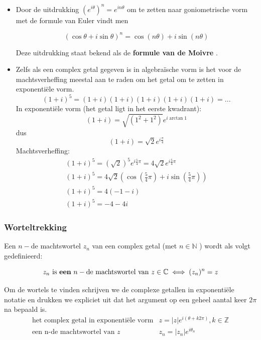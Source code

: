 \begin{itemize}
	\item Door de uitdrukking $(e^{i \theta})^n = e^{i n \theta}$ om te zetten naar goniometrische vorm met de formule van Euler vindt men
	\begin{framed}
		\[  (\cos \theta + i \sin \theta)^n = \cos (n\theta)+i \sin(n \theta) \]
	\end{framed}
	Deze uitdrukking staat bekend als de {\bf formule van de Moivre }. 
	\item Zelfs als een complex getal gegeven is in algebra\"{i}sche vorm is het voor de machtsverheffing meestal aan te raden om het getal om te zetten in exponenti\"{e}le vorm.\\
	\[ (1+i)^5 = (1+i)(1+i)(1+i)(1+i)(1+i)=... \]
	In exponenti\"{e}le vorm (het getal ligt in het eerste kwadrant):\\
	\[ (1+i) = \sqrt{(1^2 + 1^2)} e^{i \arctan{1}}    \]
	dus
	\[  (1+i)= \sqrt{2} e^{i \frac{\pi}{4}} \]
	Machtsverheffing:
	\[ \begin{array}{l} (1+i)^5 = (\sqrt{2})^5 e^{i \frac{5}{4} \pi}= 4\sqrt{2}e^{i \frac{5}{4} \pi} \\
	(1+i)^5 = 4\sqrt{2} (\cos(\frac{5}{4} \pi)+i\sin(\frac{5}{4} \pi)) \\
	(1+i)^5 = 4 (-1 -i) \\
	(1+i)^5 = -4-4i \end{array}  \]
	
\end{itemize}

\subsubsection{Worteltrekking}

Een $n-$de machtswortel $z_n$ van een complex getal (met $n \in \mathbb{N}$ ) wordt als volgt gedefinieerd:\\

\begin{framed}
	\[  z_{n} \text{ is {\bf een} } n-\text{de machtswortel van } z \in \mathbb{C} \iff (z_{n})^n = z  \] 
\end{framed}

Om de wortels te vinden schrijven we de complexe getallen in exponenti\"{e}le notatie en drukken we expliciet uit dat het argument op een geheel aantal keer $2 \pi$ na bepaald is.\\

\[ \begin{array}{ll} 
\text{het complex getal in exponenti\"{e}le vorm} & z=|z|e^{i(\theta +k 2 \pi)}, k \in \mathbb{Z} \\
\text{een n-de machtswortel van } z & z_{n}=|z_{n}|e^{i \theta_{n}}
\end{array}
\]

